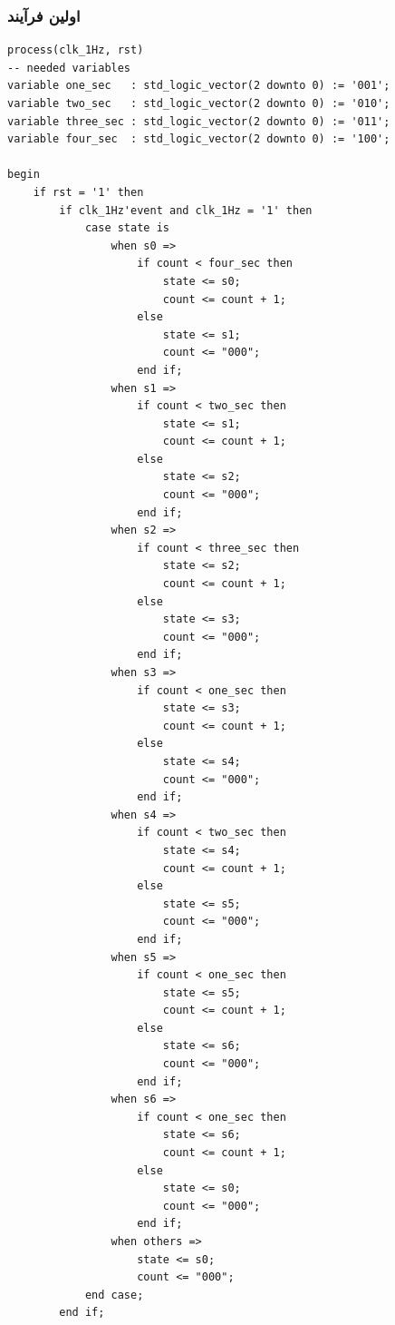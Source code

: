 \documentclass[dvipsnames, svgnames, x11names, a4paper, 11pt]{article}
\begin{document}
\subsubsection{اولین فرآیند}
\begin{latin}
\begin{lstlisting}[firstnumber=29]
process(clk_1Hz, rst)
-- needed variables
variable one_sec   : std_logic_vector(2 downto 0) := '001';
variable two_sec   : std_logic_vector(2 downto 0) := '010';
variable three_sec : std_logic_vector(2 downto 0) := '011';
variable four_sec  : std_logic_vector(2 downto 0) := '100';

begin
	if rst = '1' then
        if clk_1Hz'event and clk_1Hz = '1' then
            case state is
                when s0 =>
                    if count < four_sec then
                        state <= s0;
                        count <= count + 1;
                    else
                        state <= s1;
                        count <= "000";
                    end if;
                when s1 =>
                    if count < two_sec then
                        state <= s1;
                        count <= count + 1;
                    else
                        state <= s2;
                        count <= "000";
                    end if;
                when s2 =>
                    if count < three_sec then
                        state <= s2;
                        count <= count + 1;
                    else
                        state <= s3;
                        count <= "000";
                    end if;
                when s3 =>
                    if count < one_sec then
                        state <= s3;
                        count <= count + 1;
                    else
                        state <= s4;
                        count <= "000";
                    end if;
                when s4 =>
                    if count < two_sec then
                        state <= s4;
                        count <= count + 1;
                    else
                        state <= s5;
                        count <= "000";
                    end if;
                when s5 =>
                    if count < one_sec then
                        state <= s5;
                        count <= count + 1;
                    else
                        state <= s6;
                        count <= "000";
                    end if;
                when s6 =>
                    if count < one_sec then
                        state <= s6;
                        count <= count + 1;
                    else
                        state <= s0;
                        count <= "000";
                    end if;
                when others =>
                    state <= s0;
                    count <= "000";
            end case;
        end if;
\end{lstlisting}
\end{latin}
\end{document}
